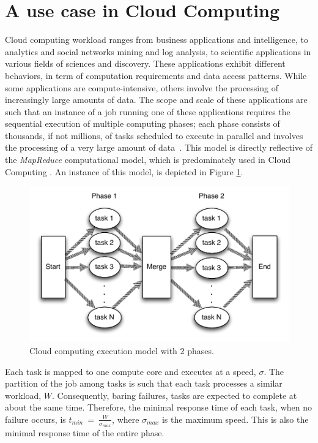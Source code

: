 \section{A use case in Cloud Computing}

Cloud computing workload ranges from business applications and
intelligence, to analytics and social networks mining and log
analysis, to scientific applications in various fields of sciences and
discovery. These applications exhibit different behaviors, in term of
computation requirements and data access patterns. While some
applications are compute-intensive, others involve the processing of
increasingly large amounts of data. The scope and scale of these
applications are such that an instance of a job running one of these
applications requires the sequential execution of multiple computing
phases; each phase consists of thousands, if not millions, of tasks
scheduled to execute in parallel and involves the processing of a very
large amount of data~\cite{lin2010data,Ferdman:2012:CCS:2150976.2150982}. This
model is directly reflective of the \emph{MapReduce} computational
model, which is predominately used in
Cloud Computing \cite{mrbs}.  An instance of this model, is depicted in Figure \ref{fig:system_model}.


\begin{figure}[!h]
	\begin{center}
		\includegraphics[width=0.6\columnwidth]{figures/system_model_1.pdf}
	\end{center}
	\caption{Cloud computing execution model with 2 phases.}
	\label{fig:system_model}
\end{figure}


Each task is mapped to one compute core and executes at a speed, $\sigma$. The partition of the job among tasks is
such that each task processes a similar
workload, $W$. Consequently, baring failures, tasks are expected to
complete at about the same time. Therefore, the minimal response time
of each task, when no failure occurs, is
$t_{min}~=~\frac{W}{\sigma_{max}}$, where $\sigma_{max}$ is the maximum speed. This is also the minimal response
time of the entire phase. 

